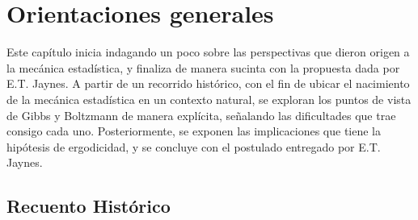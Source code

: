 \chapter{Orientaciones generales}

Este capítulo inicia indagando un poco sobre las perspectivas que dieron origen a la mecánica estadística, y finaliza de manera sucinta con la propuesta dada por E.T. Jaynes. A  partir de un recorrido histórico, con el fin de ubicar el nacimiento de la mecánica estadística en un contexto natural, se exploran los puntos de vista de Gibbs y Boltzmann de manera explícita, señalando las dificultades que trae consigo cada uno. Posteriormente, se exponen las implicaciones que tiene la hipótesis de ergodicidad, y se concluye con el postulado entregado por E.T. Jaynes.

\section{Recuento Histórico}

